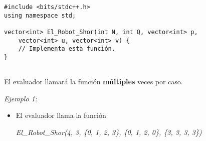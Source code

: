 \documentclass[12pt]{scrartcl}
\begin{document}
\begin{verbatim}
#include <bits/stdc++.h>
using namespace std;

vector<int> El_Robot_Shor(int N, int Q, vector<int> p,
    vector<int> u, vector<int> v) {
    // Implementa esta función.
}
    
\end{verbatim}

    El evaluador llamará la función \textbf{múltiples} veces por caso.
    

               
        {\itshape Ejemplo 1:}
        \begin{itemize}
            \item El evaluador llama la función 
            \begin{center}
                \textit{El\_Robot\_Shor(4, 3, \{0, 1, 2, 3\}, \{0, 1, 2, 0\}, \{3, 3, 3, 3\})}
            \end{center}
            

\end{itemize}
\end{document}
